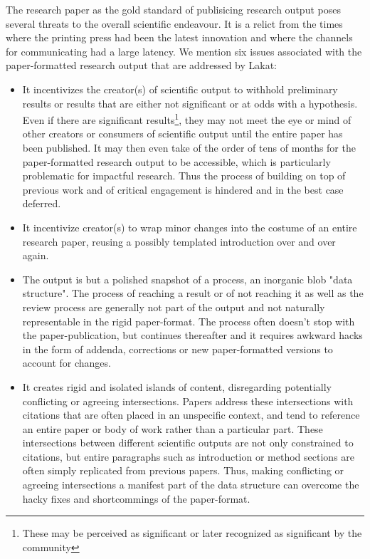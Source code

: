 The research paper as the gold standard of publisicing research output poses several threats to the overall scientific endeavour. It is a relict from the times where the printing press had been the latest innovation and where the channels for communicating had a large latency.  We mention six issues associated with the paper-formatted research output that are addressed by Lakat:
\begin{itemize}

 \item It incentivizes the creator(s) of scientific output to withhold preliminary results or results that are either not significant or at odds with a hypothesis. Even if there are significant results\footnote{These may be perceived as significant or later recognized as significant by the community}, they may not meet the eye or mind of other creators or consumers of scientific output until the entire paper has been published. It may then even take of the order of tens of months for the paper-formatted research output to be accessible, which is particularly problematic for impactful research. Thus the process of building on top of previous work and of critical engagement is hindered and in the best case deferred.
 
\item It incentivize creator(s) to wrap minor changes into the costume of an entire research paper, reusing a possibly templated introduction over and over again. 

\item The output is but a polished snapshot of a process, an inorganic blob "data structure". The process of reaching a result or of not reaching it as well as the review process are generally not part of the output and not naturally representable in the rigid paper-format. The process often doesn't stop with the paper-publication, but continues thereafter and it requires awkward hacks in the form of addenda, corrections or new paper-formatted versions to account for changes.

\item It creates rigid and isolated islands of content, disregarding potentially conflicting or agreeing intersections. Papers address these intersections with citations that are often placed in an unspecific context, and tend to reference an entire paper or body of work rather than a particular part. These intersections between different scientific outputs are not only constrained to citations, but entire paragraphs such as introduction or method sections are often simply replicated from previous papers. Thus, making conflicting or agreeing intersections a manifest part of the data structure can overcome the hacky fixes and shortcommings of the paper-format.


\end{itemize}
